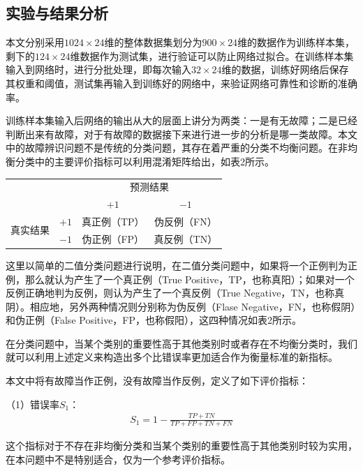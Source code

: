 \documentclass{ctacn}%
\begin{document}
\begin{multicols}{2}
\subsection{实验与结果分析}

本文分别采用$1024\times24$维的整体数据集划分为$900\times24$维的数据作为训练样本集，剩下的$124\times24$维数据作为测试集，进行验证可以防止网络过拟合。在训练样本集输入到网络时，进行分批处理，即每次输入$32\times24$维的数据，训练好网络后保存其权重和阈值，测试集再输入到训练好的网络中，来验证网络可靠性和诊断的准确率。

训练样本集输入后网络的输出从大的层面上讲分为两类：一是有无故障；二是已经判断出来有故障，对于有故障的数据接下来进行进一步的分析是哪一类故障。本文中的故障辨识问题不是传统的分类问题，其存在着严重的分类不均衡问题。在非均衡分类中的主要评价指标可以利用混淆矩阵给出，如表2所示。


\begin{center}
	\label{tab:2}
	\begin{tabular} {cccc}\toprule
		\multirow{2}{*}[-2pt]{}&\multirow{2}{*}[-2pt]{}&\multicolumn{2}{c}{预测结果}\\
		\cmidrule(lr){3-4}
		&&$+1$&$-1$\\\hline
		\multirow{2}{*}[-2pt]{真实结果}&$+1$&真正例（TP）&伪反例（FN）\\
		&$-1$&伪正例（FP）&真反例（TN）\\
		\bottomrule
\end{tabular}\end{center}

这里以简单的二值分类问题进行说明，在二值分类问题中，如果将一个正例判为正例，那么就认为产生了一个真正例（True Positive，TP，也称真阳）；如果对一个反例正确地判为反例，则认为产生了一个真反例（True Negative，TN，也称真阴）。相应地，另外两种情况则分别称为伪反例（Flase Negative，FN，也称假阴）和伪正例（False Positive，FP，也称假阳），这四种情况如表2所示。

在分类问题中，当某个类别的重要性高于其他类别时或者存在不均衡分类时，我们就可以利用上述定义来构造出多个比错误率更加适合作为衡量标准的新指标。

本文中将有故障当作正例，没有故障当作反例，定义了如下评价指标：

（1）错误率$S_1$：
\begin{align}
S_1=1-\frac{TP+TN}{TP+FP+TN+FN}
\end{align}

这个指标对于不存在非均衡分类和当某个类别的重要性高于其他类别时较为实用，在本问题中不是特别适合，仅为一个参考评价指标。


\end{multicols}
\end{document}
